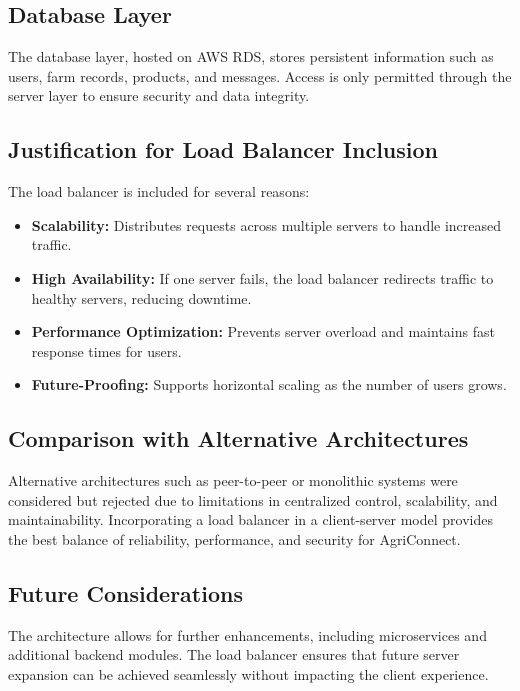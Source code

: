 \documentclass[12pt,a4paper]{article}
\begin{document}
\subsection{Database Layer}

The database layer, hosted on AWS RDS, stores persistent information such as users, farm records, products, and messages. Access is only permitted through the server layer to ensure security and data integrity.

\subsection{Justification for Load Balancer Inclusion}

The load balancer is included for several reasons:

\begin{itemize}
    \item \textbf{Scalability:} Distributes requests across multiple servers to handle increased traffic.
    \item \textbf{High Availability:} If one server fails, the load balancer redirects traffic to healthy servers, reducing downtime.
    \item \textbf{Performance Optimization:} Prevents server overload and maintains fast response times for users.
    \item \textbf{Future-Proofing:} Supports horizontal scaling as the number of users grows.
\end{itemize}

\subsection{Comparison with Alternative Architectures}

Alternative architectures such as peer-to-peer or monolithic systems were considered but rejected due to limitations in centralized control, scalability, and maintainability. Incorporating a load balancer in a client-server model provides the best balance of reliability, performance, and security for AgriConnect.

\subsection{Future Considerations}


The architecture allows for further enhancements, including microservices and additional backend modules. The load balancer ensures that future server expansion can be achieved seamlessly without impacting the client experience.
\end{document}
